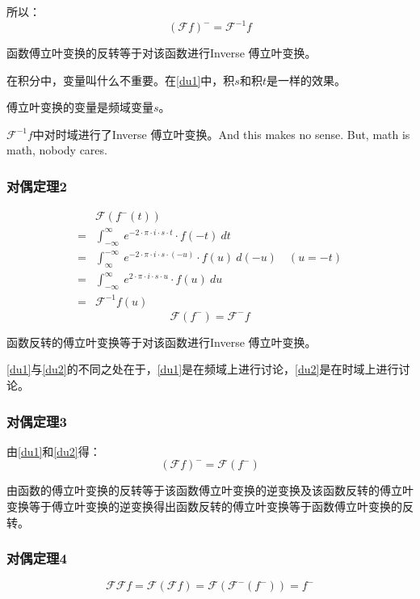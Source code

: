 所以：
\begin{equation}\label{du1}
	(\mathcal{F}f)^-=\mathcal{F}^{-1}f
\end{equation}

函数傅立叶变换的反转等于对该函数进行Inverse 傅立叶变换。

在积分中，变量叫什么不重要。在\ref{du1}中，积$s$和积$t$是一样的效果。

傅立叶变换的变量是频域变量$s$。

$\mathcal{F}^{-1}f$中对时域进行了Inverse 傅立叶变换。And this makes no sense. But, math is math, nobody cares.

\subsubsection{对偶定理2}
\begin{align*}
	  & \mathcal{F}(f^-(t))                                                                            \\
	= & \int_{-\infty}^{\infty}\ e^{-2\cdot \pi\cdot i\cdot s\cdot t}\cdot f(-t)\ dt                   \\
	= & \int_{\infty}^{-\infty}\ e^{-2\cdot \pi\cdot i\cdot s\cdot (-u)}\cdot f(u)\ d(-u) \quad (u=-t) \\
	= & \int_{-\infty}^{\infty}\ e^{2\cdot \pi\cdot i\cdot s\cdot u}\cdot f(u)\ du                     \\
	= & \mathcal{F}^{-1}f(u)
\end{align*}
\begin{equation}\label{du2}
	\mathcal{F}(f^-)=\mathcal{F}^-f
\end{equation}

函数反转的傅立叶变换等于对该函数进行Inverse 傅立叶变换。

\ref{du1}与\ref{du2}的不同之处在于，\ref{du1}是在频域上进行讨论，\ref{du2}是在时域上进行讨论。
\subsubsection{对偶定理3}
由\ref{du1}和\ref{du2}得：
\begin{equation}\label{du3}
	(\mathcal{F}f)^-=\mathcal{F}(f^-)
\end{equation}

由函数的傅立叶变换的反转等于该函数傅立叶变换的逆变换及该函数反转的傅立叶变换等于傅立叶变换的逆变换得出函数反转的傅立叶变换等于函数傅立叶变换的反转。
\subsubsection{对偶定理4}
\begin{equation}
	\mathcal{F}\mathcal{F}f= \mathcal{F}(\mathcal{F}f)=\mathcal{F}(\mathcal{F}^-(f^-)) =  f^-
\end{equation}

